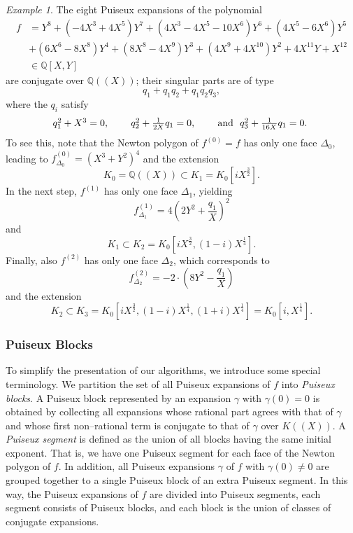 \documentclass[a4paper,11pt]{amsart}%
\theoremstyle{definition}
\theoremstyle{plain}
\theoremstyle{remark}
\newtheorem{example}[defn]{Example}
\begin{document}
\begin{example}
\label{examplePuiseux} The eight Puiseux expansions of the polynomial
\begin{align*}
f  &  =Y^{8}+(-4X^{3}+4X^{5})Y^{7}+(4X^{3}-4X^{5}-10X^{6})Y^{6}+(4X^{5}%
-6X^{6})Y^{5}\\
&  +(6X^{6}-8X^{8})Y^{4}+(8X^{8}-4X^{9})Y^{3}+(4X^{9}+4X^{10})Y^{2}%
+4X^{11}Y+X^{12}\\
&  \in{\mathbb{Q}}[X,Y]
\end{align*}
are conjugate over ${\mathbb{Q}}((X))$; their singular parts are of type
\[
q_{1}+q_{1}q_{2}+q_{1}q_{2}q_{3},
\]
where the $q_{i}$ satisfy
\[%
\begin{tabular}
[c]{ccccc}%
$q_{1}^{2}+X^{3}=0$, &  & $q_{2}^{2}+\frac{1}{2X}q_{1}=0$, &  & \text{and }
$q_{3}^{2}+\frac{1}{16X}q_{1}=0$.
\end{tabular}
\
\]
To see this, note that the Newton polygon of $f^{\left(  0\right)  }=f$ has
only one face $\Delta_{0}$, leading to $f_{\Delta_{0}}^{\left(  0\right)
}=\left(  X^{3}+Y^{2}\right)  ^{4}$ and the extension%
\[
K_{0}=\mathbb{Q}((X))\subset K_{1}=K_{0}[iX^{\frac{3}{2}}].
\]
In the next step, $f^{\left(  1\right)  }$ has only one face $\Delta_{1}$,
yielding
\[
f_{\Delta_{1}}^{\left(  1\right)  }=4\left(  2Y^{2}+\frac{q_{1}}{X}\right)
^{2}%
\]
and%
\[
K_{1}\subset K_{2}=K_{0}[iX^{\frac{3}{2}},(1-i)X^{\frac{1}{4}}].
\]
Finally, also $f^{\left(  2\right)  }$ has only one face $\Delta_{2}$, which
corresponds to
\[
f_{\Delta_{2}}^{\left(  2\right)  }=-2\cdot\left(  8Y^{2}-\frac{q_{1}}%
{X}\right)
\]
and the extension%
\[
K_{2}\subset K_{3}=K_{0}[iX^{\frac{3}{2}},(1-i)X^{\frac{1}{4}},(1+i)X^{\frac
{1}{4}}]=K_{0}[i,X^{\frac{1}{4}}].
\]

\end{example}

\subsubsection*{Puiseux Blocks}

To simplify the presentation of our algorithms, we introduce some special
terminology. We partition the set of all Puiseux expansions of $f$ into
\emph{Puiseux blocks}. A Puiseux block represented by an expansion $\gamma$
with $\gamma\left(  0\right)  =0$ is obtained by collecting all expansions
whose rational part agrees with that of $\gamma$ and whose first non--rational
term is conjugate to that of $\gamma$ over $K((X))$. \todo{that is?} A \emph{Puiseux segment}
is defined as the union of all blocks having the same initial exponent. That
is, we have one Puiseux segment for each face of the Newton polygon of $f$. In
addition, all Puiseux expansions $\gamma$ of $f$ with $\gamma\left(  0\right)
\not =0$ are grouped together to a single Puiseux block of an extra Puiseux
segment. In this way, the Puiseux expansions of $f$ are divided into Puiseux
segments, each segment consists of Puiseux blocks, and each block is the union
of classes of conjugate expansions.
\end{document}
